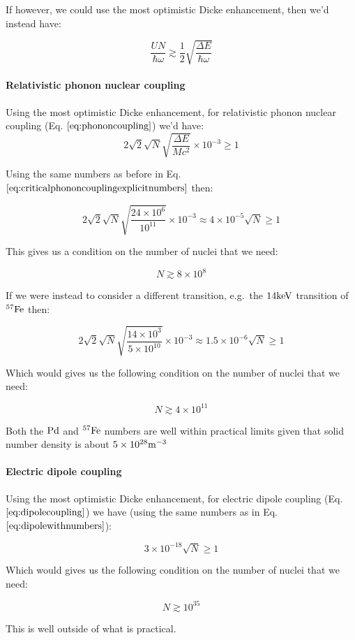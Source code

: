 \documentclass[
]{article}
\renewcommand{\[}{\begin{equation}}
\renewcommand{\]}{\end{equation}}
\begin{document}
If however, we could use the most optimistic Dicke enhancement, then
we'd instead have:

\[
\frac{UN}{\hbar\omega} \gtrsim \frac{1}{2}\sqrt{\frac{\Delta E}{\hbar\omega}}
\label{eq:dickesuperradianttransition2}
\]

\paragraph{Relativistic phonon nuclear
coupling}\label{relativistic-phonon-nuclear-coupling-1}

Using the most optimistic Dicke enhancement, for relativistic phonon
nuclear coupling (Eq. \(\ref{eq:phononcoupling}\)) we'd have: \[
2\sqrt{2}\sqrt{N} \sqrt{\frac{\Delta E}{M c^2}}  \times 10^{-3} \ge 1
\]

Using the same numbers as before in Eq.
\(\ref{eq:criticalphononcouplingexplicitnumbers}\) then:

\[
2\sqrt{2} \sqrt{N}\sqrt{\frac{24\times10^6}{10^{11}}}  \times 10^{-3} \approx 4 \times 10^{-5} \sqrt{N} \ge 1
\]

This gives us a condition on the number of nuclei that we need:

\[
N \gtrsim 8 \times 10^8
\]

If we were instead to consider a different transition, e.g.~the
\(\rm 14keV\) transition of \(\rm ^{57}Fe\) then:

\[
2\sqrt{2} \sqrt{N}\sqrt{\frac{14\times10^3}{5\times 10^{10}}}  \times 10^{-3} \approx 1.5 \times 10^{-6} \sqrt{N} \ge 1
\]

Which would gives us the following condition on the number of nuclei
that we need:

\[
N \gtrsim 4 \times 10^{11}
\]

Both the \(\rm Pd\) and \(\rm ^{57}Fe\) numbers are well within
practical limits given that solid number density is about
\(5\times 10^{28} \rm m^{-3}\)

\paragraph{Electric dipole coupling}\label{electric-dipole-coupling-1}

Using the most optimistic Dicke enhancement, for electric dipole
coupling (Eq. \(\ref{eq:dipolecoupling}\)) we have (using the same
numbers as in Eq. \(\ref{eq:dipolewithnumbers}\)):

\[
3\times 10^{-18}\sqrt{N}  \ge 1
\]

Which would gives us the following condition on the number of nuclei
that we need:

\[
N \gtrsim 10^{35}
\]

This is well outside of what is practical.

\printbibliography
\end{document}
